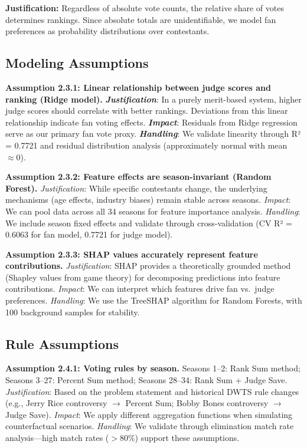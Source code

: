 \documentclass{mcmthesis}
\begin{document}
\textbf{Justification:} Regardless of absolute vote counts, the relative share of votes determines rankings. Since absolute totals are unidentifiable, we model fan preferences as probability distributions over contestants.

\iffalse
\subsection{Modeling Assumptions}

\textbf{Assumption 2.3.1: Linear relationship between judge scores and ranking (Ridge model).}
\textbf{\emph{Justification}}: In a purely merit-based system, higher judge scores should correlate with better rankings. Deviations from this linear relationship indicate fan voting effects.
\textbf{\emph{Impact}}: Residuals from Ridge regression serve as our primary fan vote proxy.
\textbf{\emph{Handling}}: We validate linearity through R² = 0.7721 and residual distribution analysis (approximately normal with mean $\approx 0$).

\textbf{Assumption 2.3.2: Feature effects are season-invariant (Random Forest).}
\textit{Justification}: While specific contestants change, the underlying mechanisms (age effects, industry biases) remain stable across seasons.
\textit{Impact}: We can pool data across all 34 seasons for feature importance analysis.
\textit{Handling}: We include season fixed effects and validate through cross-validation (CV R² = 0.6063 for fan model, 0.7721 for judge model).

\textbf{Assumption 2.3.3: SHAP values accurately represent feature contributions.}
\textit{Justification}: SHAP provides a theoretically grounded method (Shapley values from game theory) for decomposing predictions into feature contributions.
\textit{Impact}: We can interpret which features drive fan vs.\ judge preferences.
\textit{Handling}: We use the TreeSHAP algorithm for Random Forests, with 100 background samples for stability.

\subsection{Rule Assumptions}

\textbf{Assumption 2.4.1: Voting rules by season.}
Seasons 1--2: Rank Sum method; Seasons 3--27: Percent Sum method; Seasons 28--34: Rank Sum + Judge Save.
\textit{Justification}: Based on the problem statement and historical DWTS rule changes (e.g., Jerry Rice controversy $\to$ Percent Sum; Bobby Bones controversy $\to$ Judge Save).
\textit{Impact}: We apply different aggregation functions when simulating counterfactual scenarios.
\textit{Handling}: We validate through elimination match rate analysis---high match rates ($>80\%$) support these assumptions.
\end{document}
